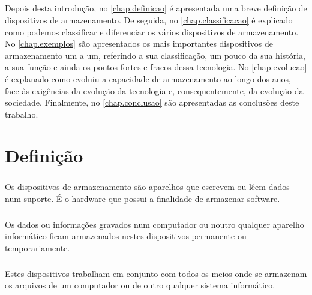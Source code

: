 \documentclass[a4paper]{report}
\begin{document}
\paragraph*{}Depois desta introdução, no \autoref{chap.definicao} é apresentada uma breve definição de dispositivos de armazenamento. De seguida, no \autoref{chap.classificacao} é explicado como podemos classificar e diferenciar os vários dispositivos de armazenamento.
No \autoref{chap.exemplos} são apresentados os mais importantes dispositivos de armazenamento um a um, referindo a sua classificação, um pouco da sua história, a sua função e ainda os pontos fortes e fracos dessa tecnologia. No \autoref{chap.evolucao} é explanado como evoluiu a capacidade de armazenamento ao longo dos anos, face às exigências da evolução da tecnologia e, consequentemente, da evolução da sociedade.
Finalmente, no \autoref{chap.conclusao} são apresentadas as conclusões deste trabalho.

\chapter{Definição}
\label{chap.definicao}

\paragraph*{}Os dispositivos de armazenamento são aparelhos que escrevem ou lêem dados num suporte. É o hardware que possui a finalidade de armazenar software. 

\paragraph*{}Os dados ou informações gravados num computador ou noutro qualquer aparelho informático ficam armazenados nestes dispositivos permanente ou temporariamente.

\paragraph*{}Estes dispositivos trabalham em conjunto com todos os meios onde se armazenam os arquivos de um computador ou de outro qualquer sistema informático.
\end{document}
